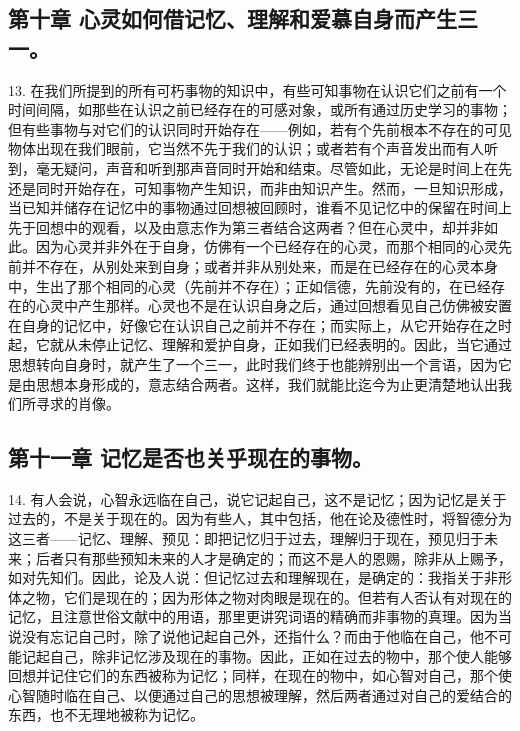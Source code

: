 \subsection{第十章 心灵如何借记忆、理解和爱慕自身而产生三一。}

13. 在我们所提到的所有可朽事物的知识中，有些可知事物在认识它们之前有一个时间间隔，如那些在认识之前已经存在的可感对象，或所有通过历史学习的事物；但有些事物与对它们的认识同时开始存在——例如，若有个先前根本不存在的可见物体出现在我们眼前，它当然不先于我们的认识；或者若有个声音发出而有人听到，毫无疑问，声音和听到那声音同时开始和结束。尽管如此，无论是时间上在先还是同时开始存在，可知事物产生知识，而非由知识产生。然而，一旦知识形成，当已知并储存在记忆中的事物通过回想被回顾时，谁看不见记忆中的保留在时间上先于回想中的观看，以及由意志作为第三者结合这两者？但在心灵中，却并非如此。因为心灵并非外在于自身，仿佛有一个已经存在的心灵，而那个相同的心灵先前并不存在，从别处来到自身；或者并非从别处来，而是在已经存在的心灵本身中，生出了那个相同的心灵（先前并不存在）；正如信德，先前没有的，在已经存在的心灵中产生那样。心灵也不是在认识自身之后，通过回想看见自己仿佛被安置在自身的记忆中，好像它在认识自己之前并不存在；而实际上，从它开始存在之时起，它就从未停止记忆、理解和爱护自身，正如我们已经表明的。因此，当它通过思想转向自身时，就产生了一个三一，此时我们终于也能辨别出一个言语，因为它是由思想本身形成的，意志结合两者。这样，我们就能比迄今为止更清楚地认出我们所寻求的肖像。\par


\subsection{第十一章 记忆是否也关乎现在的事物。}

14. 有人会说，心智永远临在自己，说它记起自己，这不是记忆；因为记忆是关于过去的，不是关于现在的。因为有些人，其中包括，他在论及德性时，将智德分为这三者——记忆、理解、预见：即把记忆归于过去，理解归于现在，预见归于未来；后者只有那些预知未来的人才是确定的；而这不是人的恩赐，除非从上赐予，如对先知们。因此，论及人说：但记忆过去和理解现在，是确定的：我指关于非形体之物，它们是现在的；因为形体之物对肉眼是现在的。但若有人否认有对现在的记忆，且注意世俗文献中的用语，那里更讲究词语的精确而非事物的真理。因为当说没有忘记自己时，除了说他记起自己外，还指什么？而由于他临在自己，他不可能记起自己，除非记忆涉及现在的事物。因此，正如在过去的物中，那个使人能够回想并记住它们的东西被称为记忆；同样，在现在的物中，如心智对自己，那个使心智随时临在自己、以便通过自己的思想被理解，然后两者通过对自己的爱结合的东西，也不无理地被称为记忆。\par

